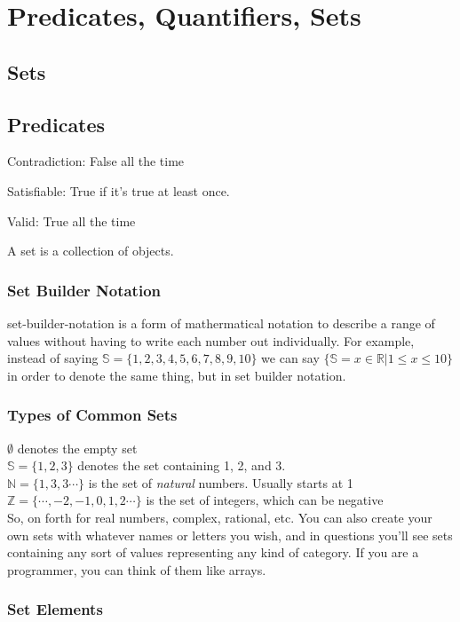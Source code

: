 \section{Predicates, Quantifiers, Sets}
\subsection{Sets}


\subsection{Predicates}
Contradiction: False all the time

Satisfiable: True if it's true at least once.

Valid: True all the time

A \gls{set} is a collection of objects. 
\subsubsection{Set Builder Notation}
\gls{set-builder-notation} is a form of mathermatical notation to describe a
range of values without having to write each number out individually. For
example, instead of saying $\mathbb{S} = \{1, 2, 3, 4, 5, 6, 7, 8, 9, 10 \}$ we
can say $\{\mathbb{S} = { x \in \mathbb{R} | 1 \leq x \leq 10}\}$ in order to
denote the same thing, but in set builder notation.

\subsubsection{Types of Common Sets}
$ \emptyset $ denotes the empty set\\
$ \mathbb{S} = \{1, 2, 3\}$ denotes the set containing 1, 2, and 3. \\  
$ \mathbb{N} = \{ 1,3,3\cdots\}$  is the set of \textit{natural} numbers.
Usually starts at 1 \\
$ \mathbb{Z} = \{\cdots, -2, -1, 0, 1, 2 \cdots\} $ is the set of integers,
which can be negative \\
\newline So, on forth  for real numbers, complex, rational, etc. You can also
create your own sets with whatever names or letters you wish, and in questions
you'll see sets containing any sort of values representing any kind of
category. If you are a programmer, you can think of them like arrays.

\subsubsection{Set Elements}


